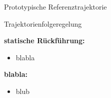 \documentclass[
	ngerman,
	10pt,				%
	aspectratio=169 	%
]{beamer}
\begin{document}
\begin{frame}[t,fragile,label=trajektorien_3]{\large Prototypische Referenztrajektorie}
	
\begin{center}
\end{center}
	
\end{frame}


\begin{frame}[t,fragile,label=trajektorienregelung_1]{\large Trajektorienfolgeregelung}
	
	\textbf{statische Rückführung:}
	\begin{itemize}
		\pause
		\item blabla
	\end{itemize}
	
	\pause
	\bigskip
	\textbf{blabla:}
	\begin{itemize}
		\pause
		\item blub	
	\end{itemize}
	
\end{frame}

\end{document}
